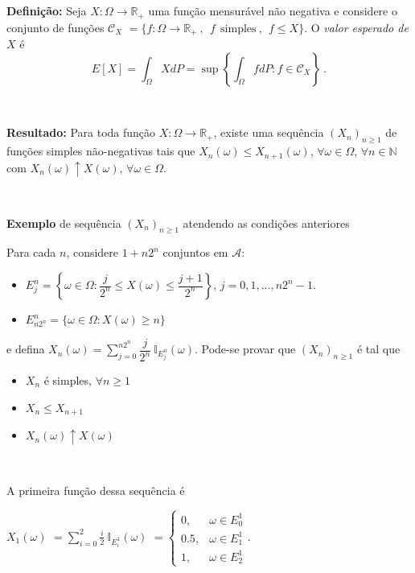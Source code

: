 \documentclass[
]{book}
\begin{document}
\(~\)

\(~\)

\textbf{Definição:} Seja \(X:\Omega\longrightarrow \mathbb{R}_+\) uma função mensurável não negativa e considere o conjunto de funções \(\mathcal{C}_X\) \(= \{ f:\Omega\longrightarrow \mathbb{R}_+~,~~f~~\text{simples}~,~~f \leq X\}\). O \emph{valor esperado de \(X\)} é
\[E[X]=\int_\Omega XdP=\sup\left\{\int_\Omega fdP: f\in \mathcal{C}_X\right\}~.\]

\(~\)

\textbf{Resultado:} Para toda função \(X:\Omega \longrightarrow \mathbb{R}_+\), existe uma sequência \((X_n)_{n\geq 1}\) de funções simples não-negativas tais que \(X_n(\omega)\leq X_{n+1}(\omega)\), \(\forall \omega \in \Omega\), \(\forall n \in \mathbb{N}\) com \(X_n(\omega)\uparrow X(\omega)\), \(\forall \omega \in \Omega\).

\(~\)

\textbf{Exemplo} de sequência \((X_n)_{n\geq 1}\) atendendo as condições anteriores

Para cada \(n\), considere \(1+n2^n\) conjuntos em \(\mathcal{A}:\)

\begin{itemize}
\item
  \(E_j^n = \left\{\omega \in \Omega: \dfrac{j}{2^n} \leq X(\omega) \leq \dfrac{j+1}{2^n} \right\}\), \(j = 0,1,\ldots,n2^n-1.\)
\item
  \(E_{n2^n}^n = \Big\{ \omega \in \Omega: X(\omega)\geq n \Big\}\)
\end{itemize}

e defina \(\displaystyle X_n(\omega) = \sum_{j=0}^{n2^n} \dfrac{j}{2^n} ~\mathbb{I}_{E_j^n}(\omega)\). Pode-se provar que \((X_n)_{n\geq 1}\) é tal que

\begin{itemize}
\item
  \(X_n\) é simples, \(\forall n \geq 1\)
\item
  \(X_n \leq X_{n+1}\)
\item
  \(X_{n}(\omega) \uparrow X(\omega)\)
\end{itemize}

\(~\)

A primeira função dessa sequência é

\(X_1(\omega)\)
\(= \displaystyle\sum_{i=0}^2 \frac{i}{2}~\mathbb{I}_{{E}_i^1}(\omega)\)
\(=\displaystyle\left\{\begin{array}{ll}0,&\omega\in{E}_0^1\\ 0.5,&\omega\in{E}_1^1\\1,&\omega\in{E}_2^1 \end{array}\right.\).
\end{document}
